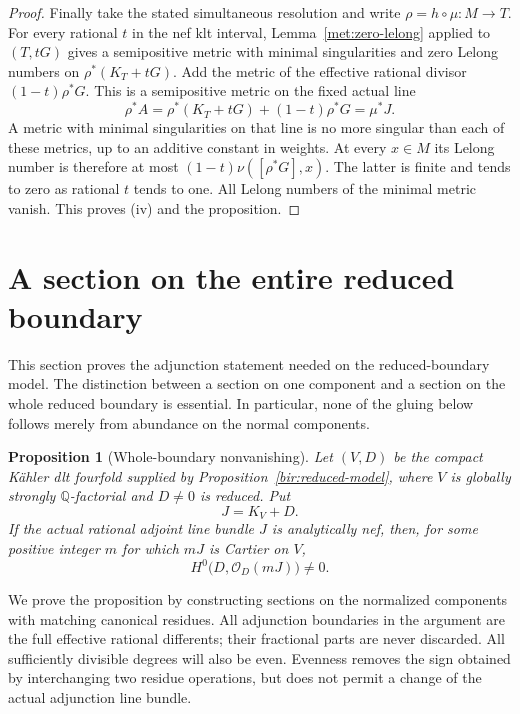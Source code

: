 \documentclass[11pt,letterpaper]{article}
\newcommand{\Q}{\mathbb{Q}}
\newcommand{\OO}{\mathcal{O}}
\newtheorem{proposition}[theorem]{Proposition}
\theoremstyle{definition}
\theoremstyle{remark}
\begin{document}
\begin{proof}
Finally take the stated simultaneous resolution and write
$\rho=h\circ\mu:M\to T$.  For every rational $t$ in the nef klt
interval, Lemma~\ref{met:zero-lelong} applied to
$(T,tG)$ gives a semipositive metric with minimal singularities
and zero Lelong numbers on $\rho^*(K_T+tG)$.  Add the metric of
the effective rational divisor $(1-t)\rho^*G$.  This is a
semipositive metric on the fixed actual line
\begin{equation}
 \rho^*A=\rho^*(K_T+tG)+(1-t)\rho^*G=\mu^*J.
 \label{bir:metric-interval}
\end{equation}
A metric with minimal singularities on that line is no more
singular than each of these metrics, up to an additive constant
in weights.  At every $x\in M$ its Lelong number is therefore at
most $(1-t)\nu([\rho^*G],x)$.  The latter is finite and tends to
zero as rational $t$ tends to one.  All Lelong numbers of the
minimal metric vanish.  This proves (iv) and the proposition.
\end{proof}

\section{A section on the entire reduced boundary}
\label{floor:sec}

This section proves the adjunction statement needed on the reduced-boundary
model.  The distinction between a section on one component and a section on
the whole reduced boundary is essential.  In particular, none of the gluing
below follows merely from abundance on the normal components.

\begin{proposition}[Whole-boundary nonvanishing]
\label{floor:section}
Let $(V,D)$ be the compact K\"ahler dlt fourfold supplied by
Proposition~\ref{bir:reduced-model}, where $V$ is globally strongly
$\Q$-factorial and $D\ne0$ is reduced.  Put
\[
 J=K_V+D.
\]
If the actual rational adjoint line bundle $J$ is analytically nef, then,
for some positive integer $m$ for which $mJ$ is Cartier on $V$,
\begin{equation}
 \label{floor:goal}
 H^0\bigl(D,\OO_D(mJ)\bigr)\ne0.
\end{equation}
\end{proposition}

We prove the proposition by constructing sections on the normalized
components with matching canonical residues.  All adjunction boundaries
in the argument are the full effective rational differents; their
fractional parts are never discarded.  All sufficiently divisible degrees
will also be even.  Evenness removes the sign obtained by interchanging
two residue operations, but does not permit a change of the actual
adjunction line bundle.
\end{document}
